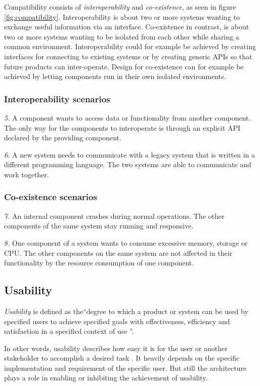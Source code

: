 Compatibility consists of \textit{interoperability} and \textit{co-existence}, as seen in figure \ref{fig:compatibility}.
Interoperability is about two or more systems wanting to exchange useful information via an interface.
Co-existence in contrast, is about two or more systems wanting to be isolated from each other while sharing a common environment.
Interoperability could for example be achieved by creating interfaces for connecting to existing systems or by creating generic \ac{API}s so that future products can inter-operate.
Design for co-existence can for example be achieved by letting components run in their own isolated environments.


\subsubsection{Interoperability scenarios}
\textit{5.} A component wants to access data or functionality from another component.
The only way for the components to interoperate is through an explicit API declared by the providing component.

\textit{6.} A new system needs to communicate with a legacy system that is written in a different programming language. The two systems are able to communicate and work together.

\subsubsection{Co-existence scenarios}
\textit{7.} An internal component crashes during normal operations. The other components of the same system stay running and responsive.

\textit{8.} One component of a system wants to consume excessive memory, storage or CPU. The other components on the same system are not affected in their functionality by the resource consumption of one component.

\subsection*{Usability}
\textit{Usability} is defined as the``degree to which a product or system can be used by specified users to achieve specified goals with effectiveness, efficiency and satisfaction in a specified context of use \citep[p. 12]{ISO25010}''.

In other words, usability describes how easy it is for the user or another stakeholder to accomplish a desired task \citep[p. 175]{Bass2012}.
It heavily depends on the specific implementation and requirement of the specific user.
But still the architecture plays a role in enabling or inhibiting the achievement of usability.

